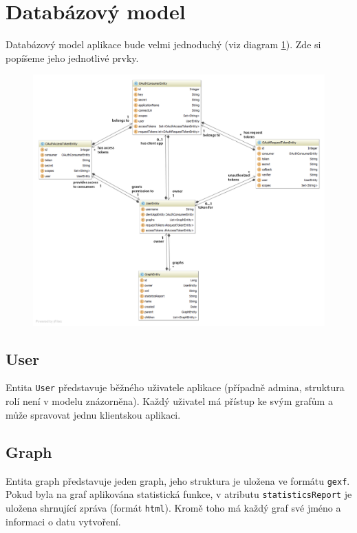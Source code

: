 \documentclass[thesis=M,czech]{FITthesis}[2014/05/6]
\begin{document}
\section{Databázový model}
Databázový model aplikace bude velmi jednoduchý (viz diagram \ref{fig:webgephi-dbmodel}). Zde si popíšeme jeho jednotlivé prvky.

\begin{figure}\centering
 	\includegraphics[width=1\textwidth]{images/class-diagram/db_model}
 	\caption[Sekvenční diagram práce s WebGephi]{}\label{fig:webgephi-dbmodel}
\end{figure}

\subsection{User}
Entita \texttt{User} představuje běžného uživatele aplikace (případně admina, struktura rolí není v modelu znázorněna). Každý
uživatel má přístup ke svým grafům a může spravovat jednu klientskou aplikaci.

\subsection{Graph}
Entita graph představuje jeden graph, jeho struktura je uložena ve formátu \texttt{gexf}. Pokud byla na graf aplikována statistická funkce,
v atributu \texttt{statisticsReport} je uložena shrnující zpráva (formát \texttt{html}). Kromě toho má každý graf své jméno a informaci 
o datu vytvoření.
\end{document}

